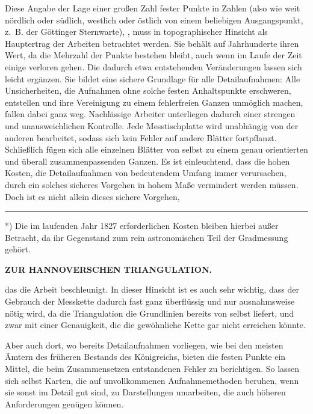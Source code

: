 Diese Angabe der Lage einer großen Zahl fester Punkte in Zahlen (also wie
weit nördlich oder südlich, westlich oder östlich von einem beliebigen
Ausgangspunkt, z.~B. der Göttinger Sternwarte), , muss in topographischer Hinsicht als Hauptertrag der Arbeiten
betrachtet werden. Sie behält auf Jahrhunderte ihren Wert, da die Mehrzahl der
Punkte bestehen bleibt, auch wenn im Laufe der Zeit einige verloren gehen.
Die dadurch etwa entstehenden Veränderungen lassen sich leicht ergänzen.
Sie bildet eine sichere Grundlage für alle Detailaufnahmen: Alle
Unsicherheiten, die Aufnahmen ohne solche festen Anhaltspunkte erschweren,
entstellen und ihre Vereinigung zu einem fehlerfreien Ganzen unmöglich
machen, fallen dabei ganz weg. Nachlässige Arbeiter unterliegen dadurch
einer strengen und unausweichlichen Kontrolle. Jede Messtischplatte wird
unabhängig von der anderen bearbeitet, sodass sich kein Fehler auf andere
Blätter fortpflanzt. Schließlich fügen sich alle einzelnen Blätter von selbst
zu einem genau orientierten und überall zusammenpassenden Ganzen. Es ist
einleuchtend, dass die hohen Kosten, die Detailaufnahmen von bedeutendem
Umfang immer verursachen, durch ein solches sicheres Vorgehen in hohem Maße
vermindert werden müssen. Doch ist es nicht allein dieses sichere Vorgehen,
\par\vfill\noindent\rule{0.25\linewidth}{0.4pt}\par\smallskip
{\footnotesize\noindent\hspace*{\parindent}*) Die im laufenden Jahr 1827 erforderlichen Kosten bleiben hierbei außer Betracht, da ihr Gegenstand zum rein astronomischen Teil der Gradmessung gehört.\par}
\clearpage
\noindent\null\hfill{\small\textbf{ZUR HANNOVERSCHEN TRIANGULATION.}}\hfill{}\par\medskip
\noindent das die Arbeit beschleunigt. In dieser Hinsicht ist es auch sehr wichtig,
dass der Gebrauch der Messkette dadurch fast ganz überflüssig und nur
ausnahmsweise nötig wird, da die Triangulation die Grundlinien bereits von
selbst liefert, und zwar mit einer Genauigkeit, die die gewöhnliche Kette
gar nicht erreichen könnte.

Aber auch dort, wo bereits Detailaufnahmen vorliegen, wie bei den meisten
Ämtern des früheren Bestands des Königreichs, bieten die festen Punkte ein
Mittel, die beim Zusammensetzen entstandenen Fehler zu berichtigen. So lassen
sich selbst Karten, die auf unvollkommenen Aufnahmemethoden beruhen, wenn
sie sonst im Detail gut sind, zu Darstellungen umarbeiten, die auch höheren
Anforderungen genügen können.

